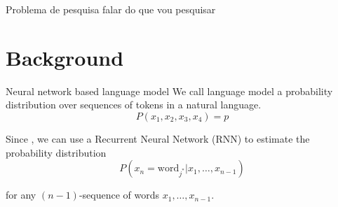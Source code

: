\documentclass[10pt]{beamer}
\begin{document}
\maketitle


\begin{frame}{Problema de pesquisa}
falar do que vou pesquisar
\end{frame}




\section{Background}

\begin{frame}{Neural network based language model}
We call \alert{language model} a probability distribution over sequences of tokens in a natural language.
\begin{equation}
P(x_1,x_2,x_3,x_4) = p
\end{equation}

Since \cite{Mikolov11}, we can use a \alert{Recurrent Neural Network (RNN)} to estimate the probability distribution   \\

\begin{equation}
P(x_{n} = \text{word}_{j^{*}} | x_{1}, \dots ,x_{n-1})
\end{equation}

for any $(n-1)$-sequence of words $x_{1}, \dots ,x_{n-1}$.
\end{frame}
\end{document}
